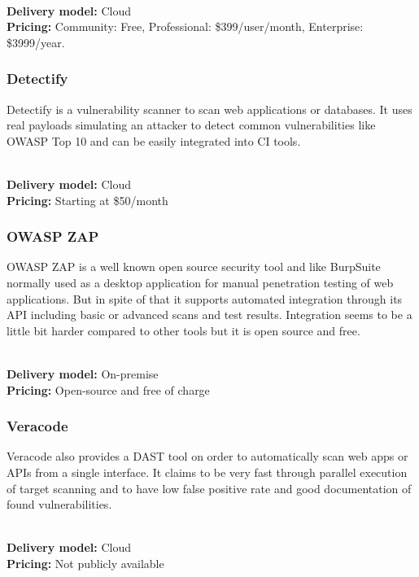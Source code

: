 \documentclass[conference]{IEEEtran}
\begin{document}
\noindent\\
\textbf{Delivery model:} Cloud
\noindent\\
\textbf{Pricing:} Community: Free, Professional: \$399/user/month, Enterprise: \$3999/year. 
\\


\noindent
\subsubsection{Detectify \cite{dast5}}

Detectify is a vulnerability scanner to scan web applications or databases. It uses real payloads simulating an attacker to detect common vulnerabilities like OWASP Top 10 and can be easily integrated into CI tools.

\noindent\\
\textbf{Delivery model:} Cloud
\noindent\\
\textbf{Pricing:} Starting at \$50/month
\\

\noindent
\subsubsection{OWASP ZAP \cite{dast6}}

OWASP ZAP is a well known open source security tool and like BurpSuite normally used as a desktop application for manual penetration testing of web applications. But in spite of that it supports automated integration through its API including basic or advanced scans and test results. Integration seems to be a little bit harder compared to other tools but it is open source and free.

\noindent\\
\textbf{Delivery model:} On-premise
\noindent\\
\textbf{Pricing:} Open-source and free of charge
\\
\noindent

\subsubsection{Veracode \cite{dast7}}

Veracode also provides a DAST tool on order to automatically scan web apps or APIs from a single interface. It claims to be very fast through parallel execution of target scanning and to have low false positive rate and good documentation of found vulnerabilities.

\noindent\\
\textbf{Delivery model:} Cloud
\noindent\\
\textbf{Pricing:} Not publicly available
\\
\end{document}
